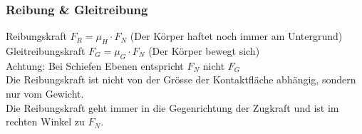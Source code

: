 \subsubsection{Reibung \& Gleitreibung}
\begin{minipage}{15.5cm}
Reibungskraft $F_{R} = \mu_{H} \cdot F_{N}$ (Der Körper haftet noch immer am Untergrund)\\
Gleitreibungskraft $F_G =  \mu_{G} \cdot F_{N}$ (Der Körper bewegt sich) \\
Achtung: Bei Schiefen Ebenen entspricht $F_{N}$ nicht $F_{G}$ \\
Die Reibungskraft ist nicht von der Grösse der Kontaktfläche abhängig, sondern nur vom Gewicht. \\
Die Reibungskraft geht immer in die Gegenrichtung der Zugkraft und ist im rechten Winkel zu $F_{N}$.
\end{minipage}
\begin{minipage}{4cm}
\end{minipage}


